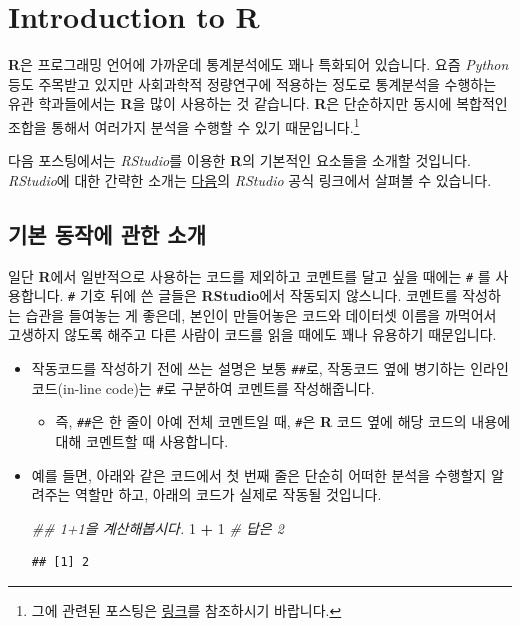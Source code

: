 \documentclass[]{book}
\newenvironment{Shaded}{\begin{snugshade}}{\end{snugshade}}
\newcommand{\CommentTok}[1]{\textcolor[rgb]{0.56,0.35,0.01}{\textit{#1}}}
\newcommand{\DecValTok}[1]{\textcolor[rgb]{0.00,0.00,0.81}{#1}}
\newcommand{\OperatorTok}[1]{\textcolor[rgb]{0.81,0.36,0.00}{\textbf{#1}}}
\newcommand{\StringTok}[1]{\textcolor[rgb]{0.31,0.60,0.02}{#1}}
\providecommand{\tightlist}{%
  \setlength{\itemsep}{0pt}\setlength{\parskip}{0pt}}
\let\rmarkdownfootnote\footnote%
\def\footnote{\protect\rmarkdownfootnote}
\begin{document}
\hypertarget{intro}{%
\chapter{\texorpdfstring{Introduction to \textbf{R}}{Introduction to R}}\label{intro}}

\textbf{R}은 프로그래밍 언어에 가까운데 통계분석에도 꽤나 특화되어 있습니다. 요즘 \emph{Python} 등도 주목받고 있지만 사회과학적 정량연구에 적용하는 정도로 통계분석을 수행하는 유관 학과들에서는 \textbf{R}을 많이 사용하는 것 같습니다. \textbf{R}은 단순하지만 동시에 복합적인 조합을 통해서 여러가지 분석을 수행할 수 있기 때문입니다.\footnote{그에 관련된 포스팅은 \href{https://blog.revolutionanalytics.com/2012/07/a-big-list-of-the-things-r-can-do.html}{링크}를 참조하시기 바랍니다.}

다음 포스팅에서는 \emph{RStudio}를 이용한 \textbf{R}의 기본적인 요소들을 소개할 것입니다. \emph{RStudio}에 대한 간략한 소개는 \href{http://sphweb.bumc.bu.edu/otlt/MPH-Modules/QuantCore/PH717-R-Basics/PH717-R-Basics3.html}{다음}의 \emph{RStudio} 공식 링크에서 살펴볼 수 있습니다.

\hypertarget{uxae30uxbcf8-uxb3d9uxc791uxc5d0-uxad00uxd55c-uxc18cuxac1c}{%
\section{기본 동작에 관한 소개}\label{uxae30uxbcf8-uxb3d9uxc791uxc5d0-uxad00uxd55c-uxc18cuxac1c}}

일단 \textbf{R}에서 일반적으로 사용하는 코드를 제외하고 코멘트를 달고 싶을 때에는 \texttt{\#} 를 사용합니다. \texttt{\#} 기호 뒤에 쓴 글들은 \textbf{RStudio}에서 작동되지 않스니다. 코멘트를 작성하는 습관을 들여놓는 게 좋은데, 본인이 만들어놓은 코드와 데이터셋 이름을 까먹어서 고생하지 않도록 해주고 다른 사람이 코드를 읽을 때에도 꽤나 유용하기 때문입니다.

\begin{itemize}
\item
  작동코드를 작성하기 전에 쓰는 설명은 보통 \texttt{\#\#}로, 작동코드 옆에 병기하는 인라인 코드(in-line code)는 \texttt{\#}로 구분하여 코멘트를 작성해줍니다.

  \begin{itemize}
  \tightlist
  \item
    즉, \texttt{\#\#}은 한 줄이 아예 전체 코멘트일 때, \texttt{\#}은 \textbf{R} 코드 옆에 해당 코드의 내용에 대해 코멘트할 때 사용합니다.
  \end{itemize}
\item
  예를 들면, 아래와 같은 코드에서 첫 번째 줄은 단순히 어떠한 분석을 수행할지 알려주는 역할만 하고, 아래의 코드가 실제로 작동될 것입니다.

\begin{Shaded}
\begin{Highlighting}[]
\CommentTok{## 1+1을 계산해봅시다.}
\DecValTok{1} \OperatorTok{+}\StringTok{ }\DecValTok{1}  \CommentTok{# 답은 2}
\end{Highlighting}
\end{Shaded}

\begin{verbatim}
## [1] 2
\end{verbatim}
\end{itemize}
\end{document}
